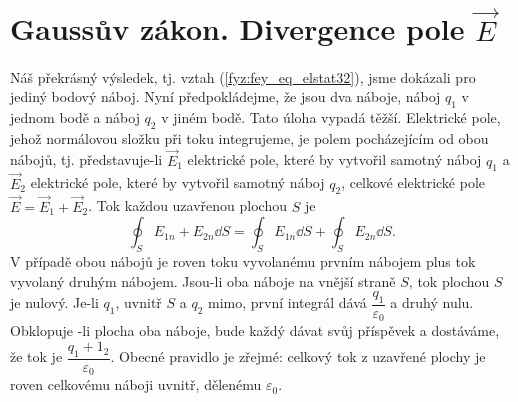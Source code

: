   \section{Gaussův zákon. Divergence pole \texorpdfstring{\(\vec{E}\)}{E}}\label{fyz:IIchapIVsecVI}
    \cite[s.~75]{Feynman02} Náš překrásný výsledek, tj. vztah (\ref{fyz:fey_eq_elstat32}), jsme 
    dokázali pro jediný bodový náboj. Nyní předpokládejme, že jsou dva náboje, náboj \(q_1\) v 
    jednom bodě a náboj \(q_2\) v jiném bodě. Tato úloha vypadá těžší. Elektrické pole, jehož 
    normálovou složku při toku integrujeme, je polem pocházejícím od obou nábojů, tj. 
    představuje-li \(\vec{E}_1\) elektrické pole, které by vytvořil samotný náboj \(q_1\) a 
    \(\vec{E}_2\) elektrické pole, které by vytvořil samotný náboj \(q_2\), celkové elektrické pole 
    \(\vec{E}=\vec{E}_1 + \vec{E}_2\). Tok každou uzavřenou plochou \(S\) je
    \begin{equation}\label{fyz:fey_eq_elstat33}
     \oint_S E_{1n} + E_{2n}\dd{S} = \oint_S E_{1n}\dd{S} + \oint_S E_{2n}\dd{S}.
    \end{equation}
    V případě obou nábojů je roven toku vyvolanému prvním nábojem plus tok vyvolaný druhým nábojem. 
    Jsou-li oba náboje na vnější straně \(S\), tok plochou \(S\) je nulový. Je-li \(q_1\), uvnitř 
    \(S\) a \(q_2\) mimo, první integrál dává \(\dfrac{q_1}{\varepsilon_0}\) a druhý nulu. 
    Obklopuje -li plocha oba náboje, bude každý dávat svůj příspěvek a dostáváme, že tok je 
    \(\dfrac{q_1+1_2}{\varepsilon_0}\). Obecné pravidlo je zřejmé: celkový tok z uzavřené plochy je 
    roven celkovému náboji uvnitř, dělenému \(\varepsilon_0\).
    
